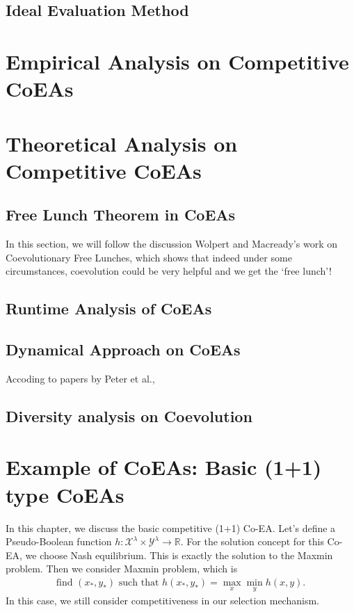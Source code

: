 \documentclass[a4paper,11pt]{report}
\theoremstyle{plain} %
\theoremstyle{definition} %
\theoremstyle{remark} %
\begin{document}
\subsection{Ideal Evaluation Method}




\newpage

\section{Empirical Analysis on Competitive CoEAs}

\section{Theoretical Analysis on Competitive CoEAs}
\subsection{Free Lunch Theorem in CoEAs}
In this section, we will follow the discussion Wolpert and Macready's work \citep{wolpert_coevolutionary_2005} on Coevolutionary Free Lunches, which shows that indeed under some circumstances, coevolution could be very helpful and we get the `free lunch'!

\subsection{Runtime Analysis of CoEAs}

\subsection{Dynamical Approach on CoEAs}
Accoding to papers by Peter et al.,


\subsection{Diversity analysis on Coevolution}

\section{Example of CoEAs: Basic (1+1) type CoEAs}
In this chapter, we discuss the basic competitive (1+1) Co-EA. Let's define a Pseudo-Boolean function $h:\mathcal{X}^{\lambda} \times \mathcal{Y}^{\lambda}   \rightarrow \mathbb{R}$. For the solution concept for this Co-EA, we choose Nash equilibrium. This is exactly the solution to the Maxmin problem. Then we consider Maxmin problem, which is 
\begin{align*}
  \text{find $(x_{*},y_{*} )$ such that }  h(x_{*},y_{*})=  \max_{x} \min_{y} h(x,y).
\end{align*}
In this case, we still consider competitiveness in our selection mechanism. 
\end{document}

